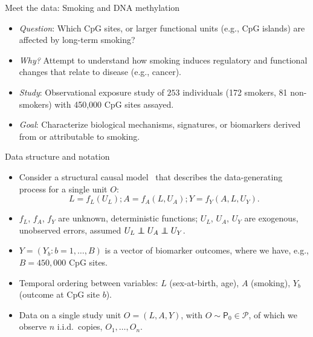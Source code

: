 \documentclass{beamer}
\newcommand\indep{\protect\mathpalette{\protect\independenT}{\perp}}
\def\independenT#1#2{\mathrel{\rlap{$#1#2$}\mkern2mu{#1#2}}}
\begin{document}

\begin{frame}[c]{Meet the data: Smoking and DNA methylation}
\begin{center}
\begin{itemize}
  \itemsep6pt
  \item \textit{Question}: Which CpG sites, or larger functional units (e.g.,
    CpG islands) are affected by long-term smoking?
  \item \textit{Why?} Attempt to understand how smoking induces regulatory and
    functional changes that relate to disease (e.g., cancer).
  \item \textit{Study}: Observational exposure study of $253$ individuals (172
    smokers, 81 non-smokers) with 450,000 CpG sites assayed.
  \item \textit{Goal}: Characterize biological mechanisms, signatures, or
    biomarkers derived from or attributable to smoking.
\end{itemize}
\end{center}

\note{
}
\end{frame}


\begin{frame}[c]{Data structure and notation}
\begin{center}
\begin{itemize}
  \itemsep6pt
  \item Consider a structural causal model~\citep{pearl2000causality} that
    describes the data-generating process for a single unit $O$:
    \begin{equation*}\label{npsem}
        L = f_L(U_L); A = f_A(L, U_A); Y = f_Y(A, L, U_Y).
      \end{equation*}
  \item $f_L$, $f_A$, $f_Y$ are unknown, deterministic functions; $U_L$, $U_A$,
    $U_Y$ are exogenous, unobserved errors, assumed $U_L \indep U_A \indep
    U_Y$.
  \item $Y = (Y_b: b = 1, \ldots, B)$ is a vector of biomarker outcomes, where
    we have, e.g., $B = 450,000$ CpG sites.
  \item Temporal ordering between variables: $L$ (sex-at-birth, age), $A$
    (smoking), $Y_b$ (outcome at CpG site $b$).
  \item Data on a single study unit $O = (L, A, Y)$, with $O \sim \mathsf{P}_0
    \in \mathcal{P}$, of which we observe $n$ i.i.d.~copies, $O_1, \ldots,
    O_n$.
\end{itemize}
\end{center}

\note{
}
\end{frame}
\end{document}
